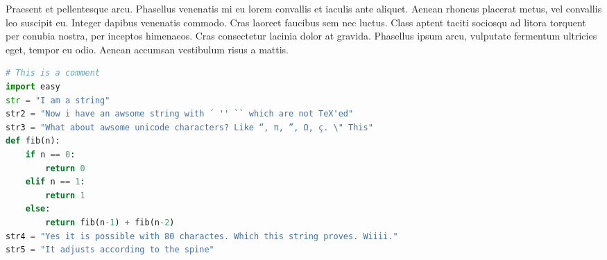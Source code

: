 Praesent et pellentesque arcu. Phasellus venenatis mi eu lorem convallis et iaculis ante aliquet. Aenean rhoncus placerat metus, vel convallis leo suscipit eu. Integer dapibus venenatis commodo. Cras laoreet faucibus sem nec luctus. Class aptent taciti sociosqu ad litora torquent per conubia nostra, per inceptos himenaeos. Cras consectetur lacinia dolor at gravida. Phasellus ipsum arcu, vulputate fermentum ultricies eget, tempor eu odio. Aenean accumsan vestibulum risus a mattis.

\begin{adjustwidth*}{0cm}{-0.4cm}
\begin{lstlisting}[language=Python,caption=Fibonacci2,label=Fibonacci2]
# This is a comment
import easy
str = "I am a string"
str2 = "Now i have an awsome string with ´ '' `` which are not TeX'ed"
str3 = "What about awsome unicode characters? Like “, π, ”, Ω, ç. \" This"
def fib(n):
    if n == 0:
        return 0
    elif n == 1:
        return 1
    else:
        return fib(n-1) + fib(n-2)
str4 = "Yes it is possible with 80 charactes. Which this string proves. Wiiii."
str5 = "It adjusts according to the spine"
\end{lstlisting}
\end{adjustwidth*}